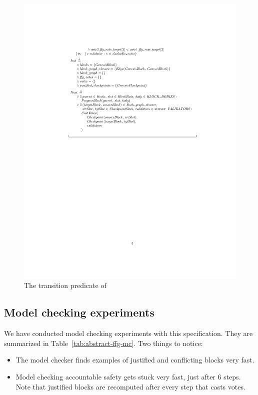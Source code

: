 \begin{figure}
    \centering
    \includegraphics[width=\textwidth]{images/abstract-ffg-next.pdf}  %
    \caption{The transition predicate of~\SpecThree{}}\label{fig:abstract-ffg-next}
\end{figure}

\subsection{Model checking experiments}

We have conducted model checking experiments with this specification. They are
summarized in Table~\ref{tab:abstract-ffg-mc}. Two things to notice:

\begin{itemize}

  \item The model checker finds examples of justified and conflicting blocks
    very fast.

  \item Model checking accountable safety gets stuck very fast, just after 6
    steps. Note that justified blocks are recomputed after every step that
    casts votes.

\end{itemize}

